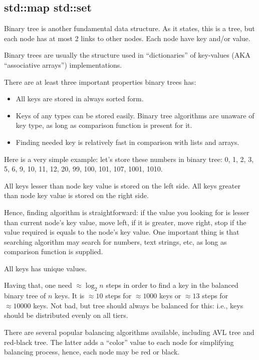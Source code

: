 \subsection{std::map \AndENRU std::set}

Binary tree is another fundamental data structure.
As it states, this is a tree, but each node has at most 2 links to other nodes.
Each node have key and/or value.

Binary trees are usually the structure used in ``dictionaries'' of key-values (\ac{AKA} ``associative arrays'') 
implementations.

There are at least three important properties binary trees has:
\begin{itemize}
\item All keys are stored in always sorted form.
\item Keys of any types can be stored easily.
Binary tree algorithms are unaware of key type, as long as comparison function is present for it.
\item Finding needed key is relatively fast in comparison with lists and arrays.
\end{itemize}

Here is a very simple example: let's store these numbers in binary tree:
0, 1, 2, 3, 5, 6, 9, 10, 11, 12, 20, 99, 100, 101, 107, 1001, 1010.



All keys lesser than node key value is stored on the left side.
All keys greater than node key value is stored on the right side.

Hence, finding algorithm is straightforward: if the value you looking for is lesser than current node's key value,
move left, if it is greater, move right, stop if the value required is equals to the node's key value.
One important thing is that searching algorithm may search for numbers, text strings, etc, as long as 
comparison function is supplied.

All keys has unique values.

Having that, one need $\approx \log_{2} n$ steps in order to find a key in the balanced binary tree of $n$ keys.
It is $\approx 10$ steps for $\approx 1000$ keys or $\approx 13$ steps for $\approx 10000$ keys.
Not bad, but tree should always be balanced for this: i.e., keys should be distributed evenly on all tiers.

There are several popular balancing algorithms available, including AVL tree and red-black tree.
The latter adds a ``color'' value to each node for simplifying balancing process, hence, each node may be red or black.

